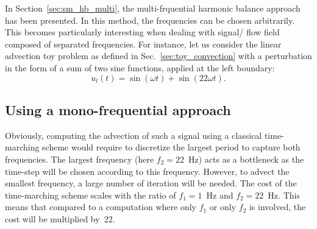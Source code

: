 
In Section~\ref{sec:sm_hb_multi}, the multi-frquential harmonic
balance approach has been presented. In this method,
the frequencies can be chosen arbitrarily. This becomes particularly
interesting when dealing with signal/ flow field composed of separated
frequencies. For instance, let us consider the linear advection toy problem
as defined in Sec.~\ref{sec:toy_convection} with 
a perturbation 
in the form of a sum of two sine functions,
applied at the left boundary:
\begin{equation}
    u_l(t) = \sin(\omega t) + \sin(22 \omega t).
    \label{eq:multifreq_inj_func}
\end{equation}

\subsection{Using a mono-frequential approach}

Obviously, computing the advection of such a signal using
a classical time-marching scheme would require to discretize the
largest period to capture both frequencies. The largest frequency
(here $f_2 = 22$~Hz) acts as a bottleneck as the time-step will be chosen
according to this frequency. However, to advect the smallest frequency,
a large number of iteration will be needed. The cost of the time-marching
scheme scales with the ratio of $f_1= 1 $~Hz and $f_2=22$~Hz. This
means that compared to a computation where only $f_1$ or only $f_2$
is involved, the cost will be multiplied by~22.

